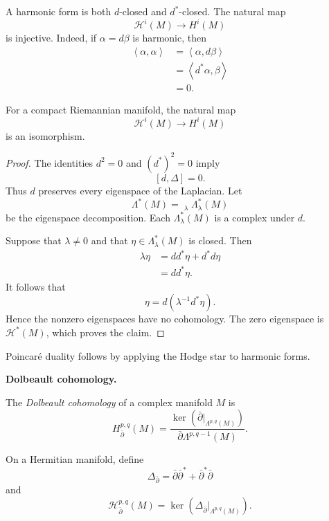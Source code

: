 A harmonic form is both $d$-closed and
$d^*$-closed. The natural map
$$
\mathcal{H}^i(M)\longrightarrow H^i(M)
$$
is injective. Indeed, if
$\alpha=d\beta$ is harmonic, then
$$
\begin{aligned}
\left\langle{}\alpha,\alpha
\right\rangle{}
&=\left\langle{}\alpha,d\beta
\right\rangle{}\\
&=\left\langle{}d^*\alpha,\beta
\right\rangle{}\\
&=0.
\end{aligned}
$$

\begin{theorem}
\label{theorem-hodge-de-rham}
For a compact Riemannian manifold, the
natural map
$$
\mathcal{H}^i(M)\longrightarrow H^i(M)
$$
is an isomorphism.
\end{theorem}

\begin{proof}
The identities $d^2=0$ and $(d^*)^2=0$
imply
$$
[d,\Delta]=0.
$$
Thus $d$ preserves every eigenspace of the
Laplacian. Let
$$
\Lambda^*(M)
=\mathop{\widehat{\bigoplus}}_\lambda
\Lambda^*_{\lambda}(M)
$$
be the eigenspace decomposition. Each
$\Lambda^*_{\lambda}(M)$ is a complex under
$d$.

Suppose that $\lambda\neq0$ and that
$\eta\in\Lambda^*_{\lambda}(M)$ is closed.
Then
$$
\begin{aligned}
\lambda\eta
&=dd^*\eta+d^*d\eta\\
&=dd^*\eta.
\end{aligned}
$$
It follows that
$$
\eta=d(\lambda^{-1}d^*\eta).
$$
Hence the nonzero eigenspaces have no
cohomology. The zero eigenspace is
$\mathcal{H}^*(M)$, which proves the
claim.
\end{proof}

Poincar\'e duality follows by applying the
Hodge star to harmonic forms.

\medskip\noindent
{\bf Dolbeault cohomology.}

\begin{definition}
\label{definition-dolbeault-cohomology}
The {\it Dolbeault cohomology} of a complex
manifold $M$ is
$$
H^{p,q}_{\bar\partial}(M)
=\frac{\ker(\bar\partial|
_{\Lambda^{p,q}(M)})}
{\bar\partial\Lambda^{p,q-1}(M)}.
$$
\end{definition}

On a Hermitian manifold, define
$$
\Delta_{\bar\partial}
=\bar\partial\bar\partial^*
+\bar\partial^*\bar\partial
$$
and
$$
\mathcal{H}^{p,q}_{\bar\partial}(M)
=\ker(\Delta_{\bar\partial}|
_{\Lambda^{p,q}(M)}).
$$

